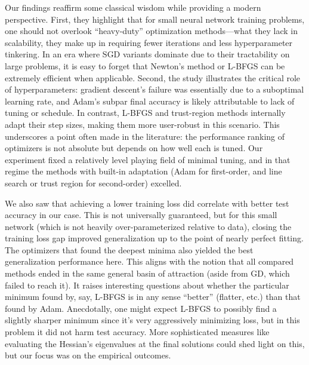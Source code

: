 \documentclass[12pt]{article}
\begin{document}
Our findings reaffirm some classical wisdom while providing a modern perspective. First, they highlight that for small neural network training problems, one should not overlook “heavy-duty” optimization methods—what they lack in scalability, they make up in requiring fewer iterations and less hyperparameter tinkering. In an era where SGD variants dominate due to their tractability on large problems, it is easy to forget that Newton’s method or L-BFGS can be extremely efficient when applicable. Second, the study illustrates the critical role of hyperparameters: gradient descent’s failure was essentially due to a suboptimal learning rate, and Adam’s subpar final accuracy is likely attributable to lack of tuning or schedule. In contrast, L-BFGS and trust-region methods internally adapt their step sizes, making them more user-robust in this scenario. This underscores a point often made in the literature: the performance ranking of optimizers is not absolute but depends on how well each is tuned. Our experiment fixed a relatively level playing field of minimal tuning, and in that regime the methods with built-in adaptation (Adam for first-order, and line search or trust region for second-order) excelled.

We also saw that achieving a lower training loss did correlate with better test accuracy in our case. This is not universally guaranteed, but for this small network (which is not heavily over-parameterized relative to data), closing the training loss gap improved generalization up to the point of nearly perfect fitting. The optimizers that found the deepest minima also yielded the best generalization performance here. This aligns with the notion that all compared methods ended in the same general basin of attraction (aside from GD, which failed to reach it). It raises interesting questions about whether the particular minimum found by, say, L-BFGS is in any sense “better” (flatter, etc.) than that found by Adam. Anecdotally, one might expect L-BFGS to possibly find a slightly sharper minimum since it’s very aggressively minimizing loss, but in this problem it did not harm test accuracy. More sophisticated measures like evaluating the Hessian’s eigenvalues at the final solutions could shed light on this, but our focus was on the empirical outcomes.
\end{document}
